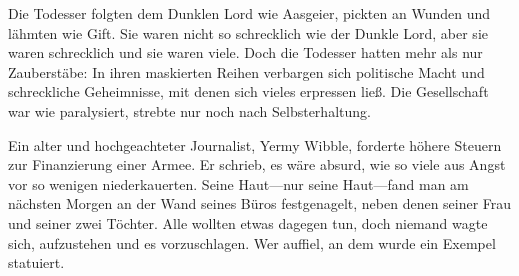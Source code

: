Die Todesser folgten dem Dunklen Lord wie Aasgeier, pickten an Wunden und lähmten wie Gift. Sie waren nicht so schrecklich wie der Dunkle Lord, aber sie waren schrecklich und sie waren viele. Doch die Todesser hatten mehr als nur Zauberstäbe: In ihren maskierten Reihen verbargen sich politische Macht und schreckliche Geheimnisse, mit denen sich vieles erpressen ließ. Die Gesellschaft war wie paralysiert, strebte nur noch nach Selbsterhaltung.

Ein alter und hochgeachteter Journalist, Yermy Wibble, forderte höhere Steuern zur Finanzierung einer Armee. Er schrieb, es wäre absurd, wie so viele aus Angst vor so wenigen niederkauerten. Seine Haut—nur seine Haut—fand man am nächsten Morgen an der Wand seines Büros festgenagelt, neben denen seiner Frau und seiner zwei Töchter. Alle wollten etwas dagegen tun, doch niemand wagte sich, aufzustehen und es vorzuschlagen. Wer auffiel, an dem wurde ein Exempel statuiert.

